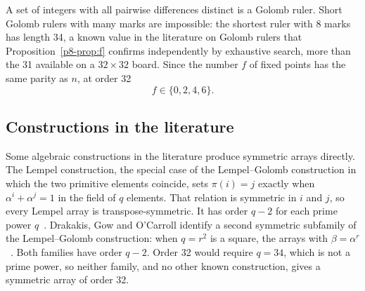 \documentclass[11pt,a4paper,oneside]{report}
\theoremstyle{definition}
\begin{document}
A set of integers with all pairwise differences distinct is a Golomb ruler. Short
Golomb rulers with many marks are impossible: the shortest ruler with 8 marks has length 34, a known value in the literature on Golomb
rulers that Proposition~\ref{p8-prop:f} confirms independently by exhaustive search,
more than the 31 available on a $32\times32$ board. Since the number $f$ of fixed points has
the same parity as $n$, at order 32
\[
f\in\{0,2,4,6\}.
\]

\subsection{Constructions in the literature}
Some algebraic constructions in the literature produce symmetric arrays directly. The Lempel
construction, the special case of the Lempel--Golomb construction in which the two primitive
elements coincide, sets $\pi(i)=j$ exactly when $\alpha^i+\alpha^j=1$ in the field of $q$
elements. That relation is symmetric in $i$ and $j$, so every Lempel array is
transpose-symmetric. It has order $q-2$ for each prime power $q$~\cite{p8-golombtaylor1984}.
Drakakis, Gow and O'Carroll identify a second symmetric subfamily of the Lempel--Golomb
construction: when $q=r^2$ is a square, the arrays with $\beta=\alpha^r$~\cite{p8-dgo2006}. Both
families have order $q-2$. Order 32 would require $q=34$, which is not a prime power, so neither
family, and no other known construction, gives a symmetric array of order 32.
\end{document}
